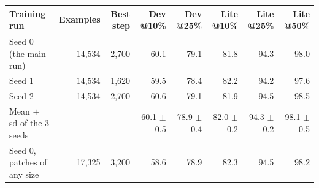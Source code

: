 \begin{tabular}{lrrrrrrr}
\toprule
Training run & Examples & Best step & Dev @10\% & Dev @25\% & Lite @10\% & Lite @25\% & Lite @50\% \\
\midrule
Seed 0 (the main run) & 14,534 & 2,700 & 60.1 & 79.1 & 81.8 & 94.3 & 98.0 \\
Seed 1 & 14,534 & 1,620 & 59.5 & 78.4 & 82.2 & 94.2 & 97.6 \\
Seed 2 & 14,534 & 2,700 & 60.6 & 79.1 & 81.9 & 94.5 & 98.5 \\
Mean $\pm$ sd of the 3 seeds &  &  & 60.1 $\pm$ 0.5 & 78.9 $\pm$ 0.4 & 82.0 $\pm$ 0.2 & 94.3 $\pm$ 0.2 & 98.1 $\pm$ 0.5 \\
Seed 0, patches of any size & 17,325 & 3,200 & 58.6 & 78.9 & 82.3 & 94.5 & 98.2 \\
\bottomrule
\end{tabular}
